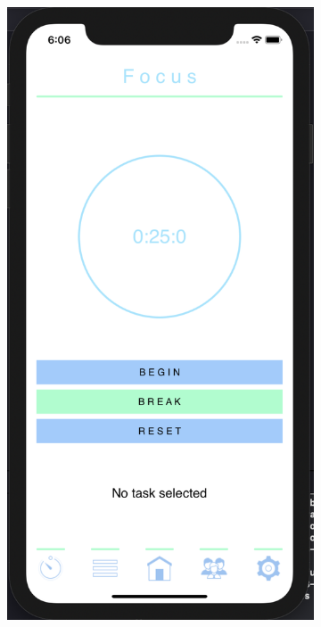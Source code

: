 \begin{figure}[H]
    \centering
    \begin{subfigure}[b]{0.3\textwidth}
        \centering
        \includegraphics[width=\textwidth]{./graphics/Implementation/Focus/focus blank.png}

\end{subfigure}
\end{figure}
